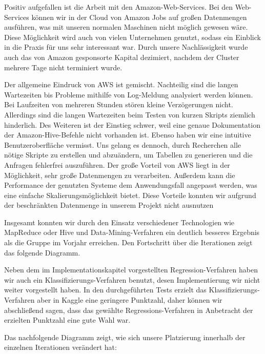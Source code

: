 Positiv aufgefallen ist die Arbeit mit den Amazon-Web-Services.
Bei den Web-Services können wir in der Cloud von Amazon Jobs auf großen Datenmengen ausführen, was mit unseren normalen Maschinen nicht möglich gewesen wäre.
Diese Möglichkeit wird auch von vielen Unternehmen genutzt, sodass ein Einblick in die Praxis für uns sehr interessant war.
Durch unsere Nachlässigkeit wurde auch das von Amazon gesponsorte Kapital dezimiert,
nachdem der Cluster mehrere Tage nicht terminiert wurde.

Der allgemeine Eindruck von AWS ist gemischt. 
Nachteilig sind die langen Wartezeiten bis Probleme mithilfe von Log-Meldung
analysiert werden können. 
Bei Laufzeiten von mehreren Stunden stören kleine Verzögerungen nicht.
Allerdings sind die langen Wartezeiten beim Testen von kurzen Skripts
ziemlich hinderlich. 
Des Weiteren ist der Einstieg schwer, weil eine genaue Dokumentation der Amazon-Hive-Befehle nicht vorhanden ist.
Ebenso haben wir eine intuitive Benutzeroberfläche vermisst.
Uns gelang es dennoch, durch Recherchen alle nötige Skripte zu erstellen und abzuändern, um Tabellen zu generieren und die Anfragen fehlerfrei auszuführen.
Der große Vorteil von AWS liegt in der Möglichkeit, sehr große Datenmengen zu verarbeiten.
Außerdem kann die Performance der genutzten Systeme dem 
Anwendungsfall angepasst werden, was eine einfache Skalierungsmöglichkeit bietet.
Diese Vorteile konnten wir aufgrund der beschränkten Datenmenge in unserem
Projekt nicht ausnutzen

Insgesamt konnten wir durch den Einsatz verschiedener Technologien wie MapReduce oder Hive und Data-Mining-Verfahren ein deutlich besseres Ergebnis als die Gruppe im Vorjahr erreichen. Den Fortschritt über die Iterationen zeigt das folgende Diagramm.

Neben dem im Implementationskapitel vorgestellten Regression-Verfahren haben wir auch ein Klassifizierungs-Verfahren benutzt, desen Implementierung wir nicht weiter vorgestellt haben. In den durchgeführten Tests erzielt das Klassifizierungs-Verfahren aber in Kaggle eine geringere Punktzahl, daher können wir abschließend sagen, dass das gewählte Regressions-Verfahren in Anbetracht der erzielten Punktzahl eine gute Wahl war.

Das nachfolgende Diagramm zeigt, wie sich unsere Platzierung innerhalb der einzelnen Iterationen verändert hat:

